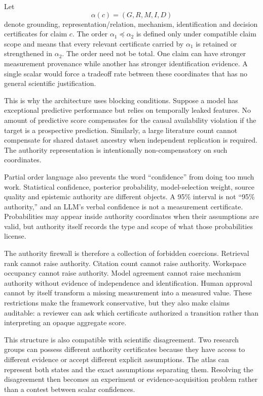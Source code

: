 Let
\[
\alpha(c)=(G,R,M,I,D)
\]
denote grounding, representation/relation, mechanism, identification and decision certificates for claim \(c\). The order \(\alpha_1\preceq\alpha_2\) is defined only under compatible claim scope and means that every relevant certificate carried by \(\alpha_1\) is retained or strengthened in \(\alpha_2\). The order need not be total. One claim can have stronger measurement provenance while another has stronger identification evidence. A single scalar would force a tradeoff rate between these coordinates that has no general scientific justification.

This is why the architecture uses blocking conditions. Suppose a model has exceptional predictive performance but relies on temporally leaked features. No amount of predictive score compensates for the causal availability violation if the target is a prospective prediction. Similarly, a large literature count cannot compensate for shared dataset ancestry when independent replication is required. The authority representation is intentionally non-compensatory on such coordinates.

Partial order language also prevents the word ``confidence'' from doing too much work. Statistical confidence, posterior probability, model-selection weight, source quality and epistemic authority are different objects. A 95\% interval is not ``95\% authority,'' and an LLM's verbal confidence is not a measurement certificate. Probabilities may appear inside authority coordinates when their assumptions are valid, but authority itself records the type and scope of what those probabilities license.

The authority firewall is therefore a collection of forbidden coercions. Retrieval rank cannot raise authority. Citation count cannot raise authority. Workspace occupancy cannot raise authority. Model agreement cannot raise mechanism authority without evidence of independence and identification. Human approval cannot by itself transform a missing measurement into a measured value. These restrictions make the framework conservative, but they also make claims auditable: a reviewer can ask which certificate authorized a transition rather than interpreting an opaque aggregate score.

This structure is also compatible with scientific disagreement. Two research groups can possess different authority certificates because they have access to different evidence or accept different explicit assumptions. The atlas can represent both states and the exact assumptions separating them. Resolving the disagreement then becomes an experiment or evidence-acquisition problem rather than a contest between scalar confidences.

